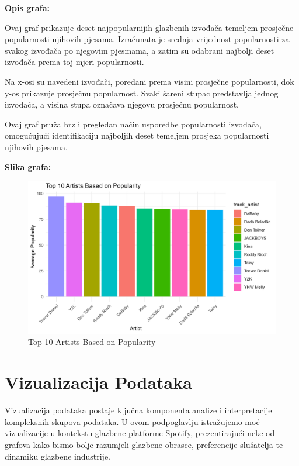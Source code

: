 	\textbf{Opis grafa:}
	
	Ovaj graf prikazuje deset najpopularnijih glazbenih izvođača temeljem prosječne popularnosti njihovih pjesama. Izračunata je srednja vrijednost popularnosti za svakog izvođača po njegovim pjesmama, a zatim su odabrani najbolji deset izvođača prema toj mjeri popularnosti.
	
	Na x-osi su navedeni izvođači, poredani prema visini prosječne popularnosti, dok y-os prikazuje prosječnu popularnost. Svaki šareni stupac predstavlja jednog izvođača, a visina stupa označava njegovu prosječnu popularnost.
	
	Ovaj graf pruža brz i pregledan način usporedbe popularnosti izvođača, omogućujući identifikaciju najboljih deset temeljem prosjeka popularnosti njihovih pjesama.
	
	\textbf{Slika grafa:}
	\begin{figure}[H]
		\includegraphics[scale=0.9]{slike/Top 10 popularity}
		\centering
		\caption{Top 10 Artists Based on Popularity}
		
	\end{figure}





\section{Vizualizacija Podataka}
	Vizualizacija podataka postaje ključna komponenta analize i interpretacije kompleksnih skupova podataka. 
	U ovom podpoglavlju istražujemo moć vizualizacije u kontekstu glazbene platforme Spotify, prezentirajući neke od grafova kako bismo bolje razumjeli glazbene obrasce, preferencije slušatelja te dinamiku glazbene industrije.
	
